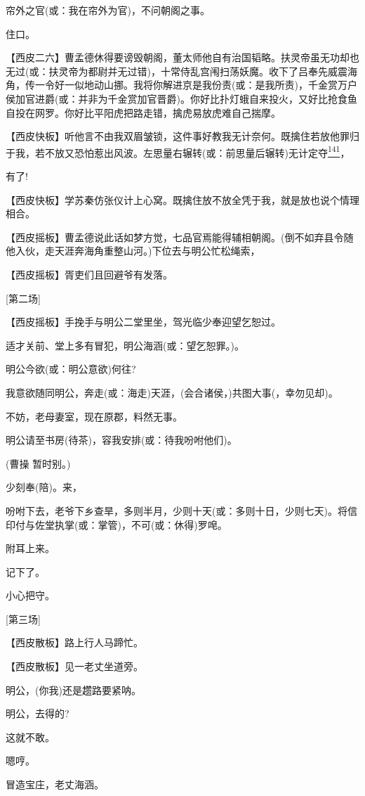 帘外之官(或：我在帘外为官)，不问朝阁之事。

住口。

【西皮二六】曹孟德休得要谤毁朝阁，董太师他自有治国韬略。扶灵帝虽无功却也无过(或：扶灵帝为都尉并无过错)，十常侍乱宫闱扫荡妖魔。收下了吕奉先威震海角，传一令好一似地动山挪。我将你解进京是我份责(或：是我所责)，千金赏万户侯加官进爵(或：并非为千金赏加官晋爵)。你好比扑灯蛾自来投火，又好比抢食鱼自投在网罗。你好比平阳虎把路走错，擒虎易放虎难自己揣摩。

【西皮快板】听他言不由我双眉皱锁，这件事好教我无计奈何。既擒住若放他罪归于我，若不放又恐怕惹出风波。左思量右辗转(或：前思量后辗转)无计定夺\protect\hyperlink{fn141}{\textsuperscript{141}}，

有了!

【西皮快板】学苏秦仿张仪计上心窝。既擒住放不放全凭于我，就是放也说个情理相合。

【西皮摇板】曹孟德说此话如梦方觉，七品官焉能得辅相朝阁。(倒不如弃县令随他入伙，走天涯奔海角重整山河。)下位去与明公忙松绳索，

【西皮摇板】胥吏们且回避爷有发落。

{[}第二场{]}

【西皮摇板】手挽手与明公二堂里坐，驾光临少奉迎望乞恕过。

适才关前、堂上多有冒犯，明公海涵(或：望乞恕罪。)。

明公今欲(或：明公意欲)何往?

我意欲随同明公，奔走(或：海走)天涯，(会合诸侯，)共图大事(，幸勿见却)。

不妨，老母妻室，现在原郡，料然无事。

明公请至书房(待茶)，容我安排(或：待我吩咐他们)。

(曹操 暂时别。)

少刻奉(陪)。来，

吩咐下去，老爷下乡查旱，多则半月，少则十天(或：多则十日，少则七天)。将信印付与佐堂执掌(或：掌管)，不可(或：休得)罗唣。

附耳上来。

记下了。

小心把守。

{[}第三场{]}

【西皮散板】路上行人马蹄忙。

【西皮散板】见一老丈坐道旁。

明公，(你我)还是趱路要紧呐。

明公，去得的?

这就不敢。

嗯哼。

冒造宝庄，老丈海涵。

